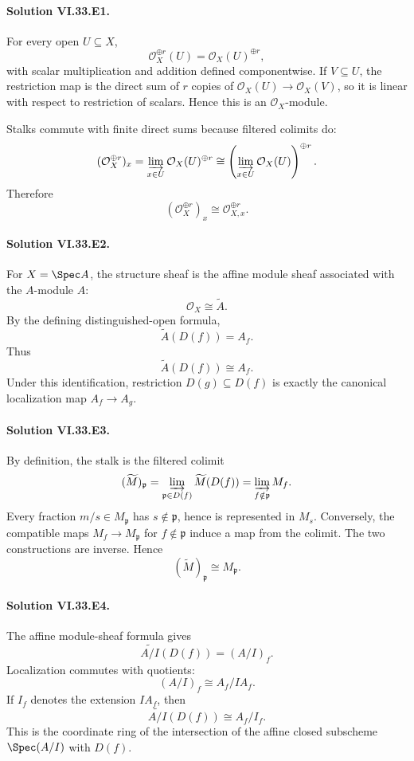 
\paragraph{Solution VI.33.E1.}
For every open \(U\subseteq X\),
\[
\mathcal O_X^{\oplus r}(U)=\mathcal O_X(U)^{\oplus r},
\]
with scalar multiplication and addition defined componentwise.  If \(V\subseteq U\), the restriction map is the
direct sum of \(r\) copies of \(\mathcal O_X(U)\to\mathcal O_X(V)\), so it is linear with respect to restriction of
scalars. Hence this is an \(\mathcal O_X\)-module.

Stalks commute with finite direct sums because filtered colimits do:
\[
(\mathcal O_X^{\oplus r})_x
=
\varinjlim_{x\in U}\mathcal O_X(U)^{\oplus r}
\cong
\left(\varinjlim_{x\in U}\mathcal O_X(U)\right)^{\oplus r}.
\]
Therefore
\[
\boxed{(\mathcal O_X^{\oplus r})_x\cong\mathcal O_{X,x}^{\oplus r}}.
\]

\paragraph{Solution VI.33.E2.}
For \(X=\Spec A\), the structure sheaf is the affine module sheaf associated with the \(A\)-module \(A\):
\[
\mathcal O_X\cong\widetilde A.
\]
By the defining distinguished-open formula,
\[
\widetilde A(D(f))=A_f.
\]
Thus
\[
\boxed{\widetilde A(D(f))\cong A_f}.
\]
Under this identification, restriction \(D(g)\subseteq D(f)\) is exactly the canonical localization map
\(A_f\to A_g\).

\paragraph{Solution VI.33.E3.}
By definition, the stalk is the filtered colimit
\[
(\widetilde M)_{\mathfrak p}
=
\varinjlim_{\mathfrak p\in D(f)}\widetilde M(D(f))
=
\varinjlim_{f\notin\mathfrak p}M_f.
\]
Every fraction \(m/s\in M_{\mathfrak p}\) has \(s\notin\mathfrak p\), hence is represented in \(M_s\). Conversely,
the compatible maps \(M_f\to M_{\mathfrak p}\) for \(f\notin\mathfrak p\) induce a map from the colimit.  The two
constructions are inverse. Hence
\[
\boxed{(\widetilde M)_{\mathfrak p}\cong M_{\mathfrak p}}.
\]

\paragraph{Solution VI.33.E4.}
The affine module-sheaf formula gives
\[
\widetilde{A/I}(D(f))=(A/I)_f.
\]
Localization commutes with quotients:
\[
(A/I)_f
\cong
A_f/I A_f.
\]
If \(I_f\) denotes the extension \(IA_f\), then
\[
\boxed{\widetilde{A/I}(D(f))\cong A_f/I_f}.
\]
This is the coordinate ring of the intersection of the affine closed subscheme \(\Spec(A/I)\) with \(D(f)\).

